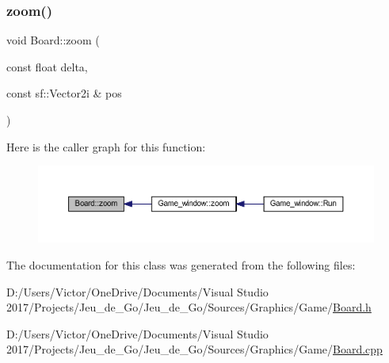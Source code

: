 \subsubsection{\texorpdfstring{zoom()}{zoom()}}
{\footnotesize\ttfamily void Board\+::zoom (\begin{DoxyParamCaption}\item[{const float}]{delta,  }\item[{const sf\+::\+Vector2i \&}]{pos }\end{DoxyParamCaption})}

Here is the caller graph for this function\+:\nopagebreak
\begin{figure}[H]
\begin{center}
\leavevmode
\includegraphics[width=350pt]{class_board_a0b098808fd9214c752097a623a7c717e_icgraph}
\end{center}
\end{figure}


The documentation for this class was generated from the following files\+:\begin{DoxyCompactItemize}
\item 
D\+:/\+Users/\+Victor/\+One\+Drive/\+Documents/\+Visual Studio 2017/\+Projects/\+Jeu\+\_\+de\+\_\+\+Go/\+Jeu\+\_\+de\+\_\+\+Go/\+Sources/\+Graphics/\+Game/\hyperlink{_board_8h}{Board.\+h}\item 
D\+:/\+Users/\+Victor/\+One\+Drive/\+Documents/\+Visual Studio 2017/\+Projects/\+Jeu\+\_\+de\+\_\+\+Go/\+Jeu\+\_\+de\+\_\+\+Go/\+Sources/\+Graphics/\+Game/\hyperlink{_board_8cpp}{Board.\+cpp}\end{DoxyCompactItemize}
